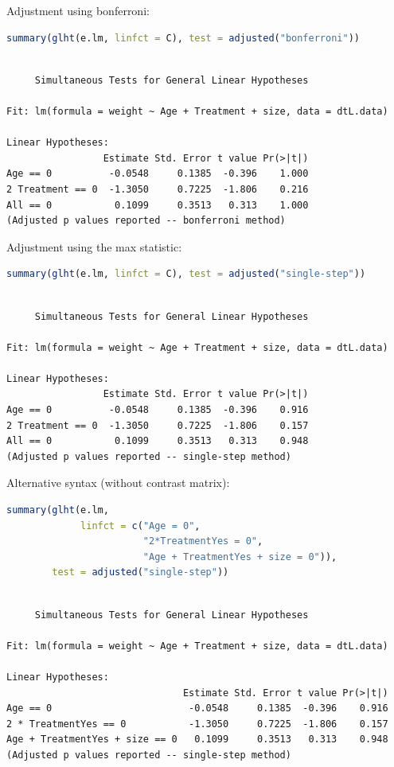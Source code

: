 \documentclass{article}
\begin{document}
Adjustment using bonferroni:
\begin{lstlisting}[language=r,numbers=none]
summary(glht(e.lm, linfct = C), test = adjusted("bonferroni"))
\end{lstlisting}

\label{}
\begin{verbatim}

	 Simultaneous Tests for General Linear Hypotheses

Fit: lm(formula = weight ~ Age + Treatment + size, data = dtL.data)

Linear Hypotheses:
                 Estimate Std. Error t value Pr(>|t|)
Age == 0          -0.0548     0.1385  -0.396    1.000
2 Treatment == 0  -1.3050     0.7225  -1.806    0.216
All == 0           0.1099     0.3513   0.313    1.000
(Adjusted p values reported -- bonferroni method)
\end{verbatim}

Adjustment using the max statistic:
\begin{lstlisting}[language=r,numbers=none]
summary(glht(e.lm, linfct = C), test = adjusted("single-step"))
\end{lstlisting}

\label{}
\begin{verbatim}

	 Simultaneous Tests for General Linear Hypotheses

Fit: lm(formula = weight ~ Age + Treatment + size, data = dtL.data)

Linear Hypotheses:
                 Estimate Std. Error t value Pr(>|t|)
Age == 0          -0.0548     0.1385  -0.396    0.916
2 Treatment == 0  -1.3050     0.7225  -1.806    0.157
All == 0           0.1099     0.3513   0.313    0.948
(Adjusted p values reported -- single-step method)
\end{verbatim}

Alternative syntax (without contrast matrix):
\begin{lstlisting}[language=r,numbers=none]
summary(glht(e.lm, 
             linfct = c("Age = 0",
                        "2*TreatmentYes = 0",
                        "Age + TreatmentYes + size = 0")), 
        test = adjusted("single-step"))
\end{lstlisting}

\label{}
\begin{verbatim}

	 Simultaneous Tests for General Linear Hypotheses

Fit: lm(formula = weight ~ Age + Treatment + size, data = dtL.data)

Linear Hypotheses:
                               Estimate Std. Error t value Pr(>|t|)
Age == 0                        -0.0548     0.1385  -0.396    0.916
2 * TreatmentYes == 0           -1.3050     0.7225  -1.806    0.157
Age + TreatmentYes + size == 0   0.1099     0.3513   0.313    0.948
(Adjusted p values reported -- single-step method)
\end{verbatim}
\end{document}
